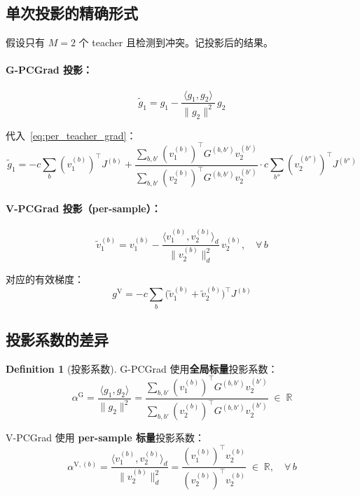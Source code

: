 \documentclass[11pt,a4paper]{article}
\newcommand{\R}{\mathbb{R}}
\theoremstyle{definition}
\newtheorem{definition}{Definition}
\begin{document}
\subsection{单次投影的精确形式}

假设只有 $M=2$ 个 teacher 且检测到冲突。记投影后的结果。

\paragraph{G-PCGrad 投影：}
\begin{equation}
\tilde{g}_1 = g_1 - \frac{\langle g_1, g_2\rangle}{\|g_2\|^2}\,g_2
\label{eq:G_proj_explicit}
\end{equation}

代入~\eqref{eq:per_teacher_grad}：
\begin{equation}
\tilde{g}_1 = -c\sum_b (v_1^{(b)})^\top J^{(b)}
+ \frac{\sum_{b,b'} (v_1^{(b)})^\top G^{(b,b')} v_2^{(b')}}
{\sum_{b,b'} (v_2^{(b)})^\top G^{(b,b')} v_2^{(b')}}
\cdot c\sum_{b''} (v_2^{(b'')})^\top J^{(b'')}
\end{equation}

\paragraph{V-PCGrad 投影（per-sample）：}
\begin{equation}
\tilde{v}_1^{(b)} = v_1^{(b)} - \frac{\langle v_1^{(b)}, v_2^{(b)}\rangle_d}{\|v_2^{(b)}\|_d^2}\,v_2^{(b)}, \quad \forall\, b
\label{eq:V_proj_explicit}
\end{equation}

对应的有效梯度：
\begin{equation}
g^{\mathrm{V}} = -c\sum_b \bigl(\tilde{v}_1^{(b)} + \tilde{v}_2^{(b)}\bigr)^\top J^{(b)}
\end{equation}

\subsection{投影系数的差异}

\begin{definition}[投影系数]
G-PCGrad 使用\textbf{全局标量}投影系数：
\begin{equation}
\alpha^{\mathrm{G}} = \frac{\langle g_1, g_2\rangle}{\|g_2\|^2}
= \frac{\sum_{b,b'} (v_1^{(b)})^\top G^{(b,b')} v_2^{(b')}}
{\sum_{b,b'} (v_2^{(b)})^\top G^{(b,b')} v_2^{(b')}} \;\in\;\R
\label{eq:alpha_G}
\end{equation}

V-PCGrad 使用 \textbf{per-sample 标量}投影系数：
\begin{equation}
\alpha^{\mathrm{V},(b)} = \frac{\langle v_1^{(b)}, v_2^{(b)}\rangle_d}{\|v_2^{(b)}\|_d^2}
= \frac{(v_1^{(b)})^\top v_2^{(b)}}{(v_2^{(b)})^\top v_2^{(b)}} \;\in\;\R, \quad \forall\, b
\label{eq:alpha_V}
\end{equation}
\end{definition}
\end{document}
